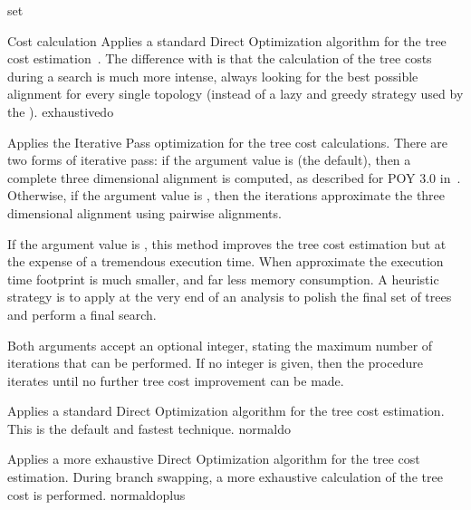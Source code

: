 \begin{command}{set}{}
\begin{arguments}
\begin{argumentgroup}{Cost calculation}
                {Applies a standard Direct Optimization algorithm for the tree
                cost estimation~\cite{wheeler1996,wheeler2002a}. The difference 
                with  is
                that the calculation of the tree costs during a search is much
                more intense, always looking for the best possible alignment 
                for every single topology (instead of a lazy and greedy strategy
                used by the ).}
                {exhaustivedo}

                {Applies the Iterative Pass optimization for the tree cost
                calculations. There are two forms of iterative pass: if the
                argument value is  (the default), then a complete three
                dimensional alignment is computed, as described for POY 3.0 in~\cite{wheeler2003a}. 
                Otherwise, if the argument value is , then the iterations
                approximate the three dimensional alignment using pairwise
                alignments. 
                 
                    If the argument value is , this method improves the tree
                cost estimation but at the expense of a tremendous execution
                time. When approximate the execution time footprint is much
                smaller, and far less memory consumption.
                A heuristic strategy is to apply   at the 
                very end of an analysis to polish the final set of trees and perform a final search. 
                
                Both arguments accept an optional integer, stating the maximum
                number of iterations that can be performed. If no integer is
                given, then the procedure iterates until no further tree cost
                improvement can be made.}
                {}

                {Applies a standard Direct Optimization algorithm for the tree
                cost estimation. This is the default and fastest technique.}
                {normaldo}

                {Applies a more exhaustive Direct Optimization algorithm for the tree cost estimation. 
                During branch swapping, a more exhaustive calculation of the tree cost is performed.}
                {normaldoplus}
                

\end{argumentgroup}
\end{arguments}
\end{command}
